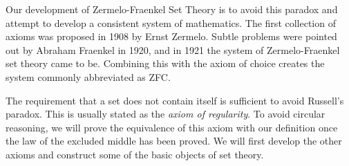     Our development of Zermelo-Fraenkel Set Theory is to avoid this
    paradox and attempt to develop a consistent system of mathematics.
    The first collection of axioms was proposed in 1908 by Ernst
    Zermelo. Subtle problems were pointed out by Abraham Fraenkel
    in 1920, and in 1921 the system of Zermelo-Fraenkel set theory came
    to be. Combining this with the axiom of choice creates the system
    commonly abbreviated as ZFC.
    \par\hfill\par
    The requirement that a set does not contain itself is sufficient to
    avoid Russell's paradox. This is usually stated as the
    \textit{axiom of regularity}. To avoid circular reasoning, we will
    prove the equivalence of this axiom with our definition once the law
    of the excluded middle has been proved. We will first develop the
    other axioms and construct some of the basic objects of set theory.
